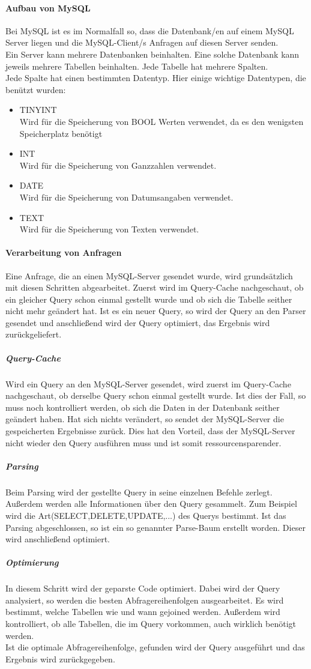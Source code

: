 \paragraph{Aufbau von MySQL}
Bei MySQL ist es im Normalfall so, dass die Datenbank/en auf einem MySQL Server liegen und die MySQL-Client/s Anfragen auf diesen Server senden.\\
Ein Server kann mehrere Datenbanken beinhalten. Eine solche Datenbank kann jeweils mehrere Tabellen beinhalten. Jede Tabelle hat mehrere Spalten.\\
Jede Spalte hat einen bestimmten Datentyp. Hier einige wichtige Datentypen, die benützt wurden:
\begin{itemize}
	\item TINYINT\\
	Wird für die Speicherung von BOOL Werten verwendet, da es den wenigsten Speicherplatz benötigt
	\item INT\\
	Wird für die Speicherung von Ganzzahlen verwendet.
	\item DATE\\
	Wird für die Speicherung von Datumsangaben verwendet.
	\item TEXT\\
	Wird für die Speicherung von Texten verwendet.
\end{itemize}
\paragraph{Verarbeitung von Anfragen}
Eine Anfrage, die an einen MySQL-Server gesendet wurde, wird grundsätzlich mit diesen Schritten abgearbeitet. Zuerst wird im Query-Cache nachgeschaut, ob ein gleicher Query schon einmal gestellt wurde und ob sich die Tabelle seither nicht mehr geändert hat. Ist es ein neuer Query, so wird der Query an den Parser gesendet und anschließend wird der Query optimiert, das Ergebnis wird zurückgeliefert.
\subparagraph{Query-Cache}
Wird ein Query an den MySQL-Server gesendet, wird zuerst im Query-Cache nachgeschaut, ob derselbe Query schon einmal gestellt wurde. Ist dies der Fall, so muss noch kontrolliert werden, ob sich die Daten in der Datenbank seither geändert haben. Hat sich nichts verändert, so sendet der MySQL-Server die gespeicherten Ergebnisse zurück. Dies hat den Vorteil, dass der MySQL-Server nicht wieder den Query ausführen muss und ist somit ressourcensparender. 
\subparagraph{Parsing}
Beim Parsing wird der gestellte Query in seine einzelnen Befehle zerlegt. Außerdem werden alle Informationen über den Query gesammelt. Zum Beispiel wird die Art(SELECT,DELETE,UPDATE,...) des Querys bestimmt. Ist das Parsing abgeschlossen, so ist ein so genannter Parse-Baum erstellt worden. Dieser wird anschließend optimiert.
\subparagraph{Optimierung}
In diesem Schritt wird der geparste Code optimiert. Dabei wird der Query analysiert, so werden die besten Abfragereihenfolgen ausgearbeitet. Es wird bestimmt, welche Tabellen wie und wann gejoined werden. Außerdem wird kontrolliert, ob alle Tabellen, die im Query vorkommen, auch wirklich benötigt werden.\\
Ist die optimale Abfragereihenfolge, gefunden wird der Query ausgeführt und das Ergebnis wird zurückgegeben.
